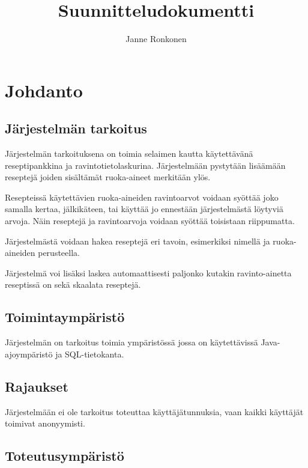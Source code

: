 \documentclass[12pt]{article}
\begin{document}
\begin{titlepage}
\title{Suunnitteludokumentti}


\author{Janne Ronkonen}
\maketitle
\end{titlepage}

\tableofcontents

\section{Johdanto}

\subsection{Järjestelmän tarkoitus}


Järjestelmän tarkoituksena on toimia selaimen kautta käytettävänä reseptipankkina ja ravintotietolaskurina. Järjestelmään pystytään lisäämään reseptejä joiden sisältämät ruoka-aineet merkitään ylös.

Resepteissä käytettävien ruoka-aineiden ravintoarvot voidaan syöttää joko samalla kertaa, jälkikäteen, tai käyttää jo ennestään järjestelmästä löytyviä arvoja. Näin reseptejä ja ravintoarvoja voidaan syöttää toisistaan riippumatta.

Järjestelmästä voidaan hakea reseptejä eri tavoin, esimerkiksi nimellä ja ruoka-aineiden perusteella.

Järjestelmä voi lisäksi laskea automaattisesti paljonko kutakin ravinto-ainetta reseptissä on sekä skaalata reseptejä.



\subsection{Toimintaympäristö}
Järjestelmän on tarkoitus toimia ympäristössä jossa on käytettävissä Java-ajoympäristö ja SQL-tietokanta.  
\subsection{Rajaukset}
Järjestelmään ei ole tarkoitus toteuttaa käyttäjätunnuksia, vaan kaikki käyttäjät toimivat anonyymisti. 

\subsection{Toteutusympäristö}
\end{document}
